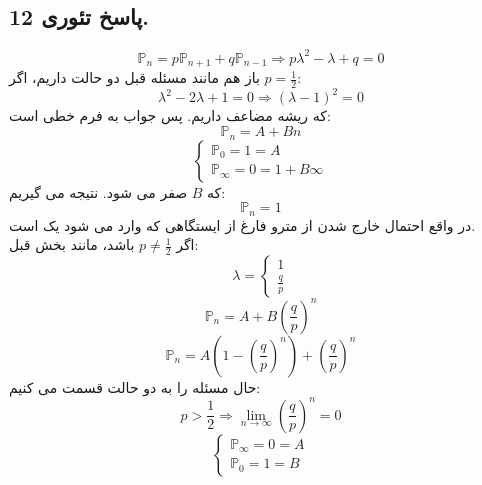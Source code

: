 \documentclass[]{article}
\begin{document}
\subsection{پاسخ تئوری 12.}	
\begin{equation}
	\nonumber
	\mathbb{P}_n = p\mathbb{P}_{n+1}+q\mathbb{P}_{n-1} \Longrightarrow  p\lambda^2 - \lambda+q=0
\end{equation}
باز هم مانند مسئله قبل دو حالت داریم، اگر
$p=\frac{1}{2}$:
\begin{equation}
	\nonumber
	\lambda^2-2\lambda+1=0 \Longrightarrow (\lambda-1)^2=0
\end{equation}
که ریشه مضاعف داریم. پس جواب به فرم خطی است:
\begin{equation}
	\nonumber
	\mathbb{P}_n = A + Bn
\end{equation}
\begin{equation}
	\nonumber
	\begin{cases}
		\mathbb{P}_0 = 1 = A\\
		\mathbb{P}_\infty = 0 = 1 + B \infty		
	\end{cases}
\end{equation}
که
$B$
صفر می شود. نتیجه می گیریم:
\begin{equation}
	\nonumber
	\mathbb{P}_n = 1
\end{equation}
در واقع احتمال خارج شدن از مترو فارغ از ایستگاهی که وارد می شود یک است.\\
اگر
$p\neq \frac{1}{2}$ 
باشد، مانند بخش قبل:
\begin{equation}
	\nonumber
	\lambda = 
	\begin{cases}
		1\\
		\frac{q}{p}
	\end{cases}
\end{equation}
\begin{equation}
	\nonumber
	\mathbb{P}_n = A+B(\frac{q}{p})^n
\end{equation}
\begin{equation}
	\nonumber
	\mathbb{P}_n = A(1-(\frac{q}{p})^n)+(\frac{q}{p})^n
\end{equation}
حال مسئله را به دو حالت قسمت می کنیم:
\begin{equation}
	\nonumber
	p>\frac{1}{2} \Longrightarrow \lim_{n \to \infty} (\frac{q}{p})^n=0
\end{equation}
\begin{equation}
	\nonumber
	\begin{cases}
		\mathbb{P}_\infty = 0 = A \\
		\mathbb{P}_0 = 1  = B 		
	\end{cases}
\end{equation}
\end{document}
